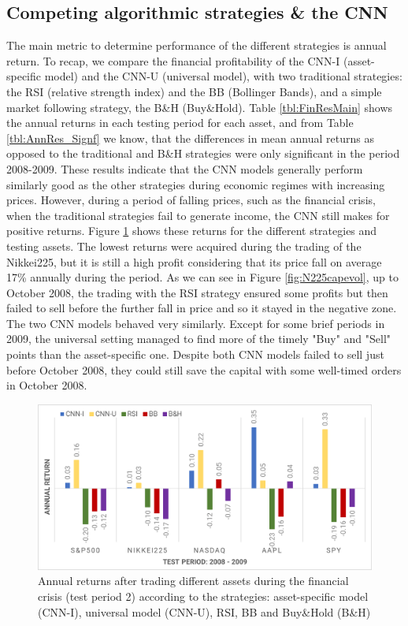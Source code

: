\documentclass[12pt, a4paper]{article}
\begin{document}
\subsection{Competing algorithmic strategies \& the CNN}

The main metric to determine performance of the different strategies is annual return. 
To recap, we compare the financial profitability of the CNN-I (asset-specific model) and the CNN-U (universal model), with two traditional strategies: the RSI (relative strength index) and the BB (Bollinger Bands), and a simple market following strategy, the B\&H (Buy\&Hold). 
Table \ref{tbl:FinResMain} shows the annual returns in each testing period for each asset, and from Table \ref{tbl:AnnRes_Signf} we know, that the differences in mean annual returns as opposed to the traditional and B\&H strategies were only significant in the period 2008-2009. 
These results indicate that the CNN models generally perform similarly good as the other strategies during economic regimes with increasing prices. However, during a period of falling prices, such as the financial crisis, when the traditional strategies fail to generate income, the CNN still makes for positive returns. 
Figure \ref{fig:CNNvsComp_2} shows these returns for the different strategies and testing assets. The lowest returns were acquired during the trading of the Nikkei225, but it is still a high profit considering that its price fall on average 17\% annually during the period. As we can see in Figure \ref{fig:N225capevol}, up to October 2008, the trading with the RSI strategy ensured some profits but then failed to sell before the further fall in price and so it stayed in the negative zone. The two CNN models behaved very similarly. 
Except for some brief periods in 2009, the universal setting managed to find more of the timely "Buy" and "Sell" points than the asset-specific one. Despite both CNN models failed to sell just before October 2008, they could still save the capital with some well-timed orders in October 2008.
\begin{figure}[ht]
    \centering
    \includegraphics[width=.75\textwidth]{images/CNNvsComp_Crisis.png}
    \caption{Annual returns after trading different assets during the financial crisis (test period 2) according to the strategies: asset-specific model (CNN-I), universal model (CNN-U), RSI, BB and Buy\&Hold (B\&H)}
    \label{fig:CNNvsComp_2}
\end{figure}
\end{document}
